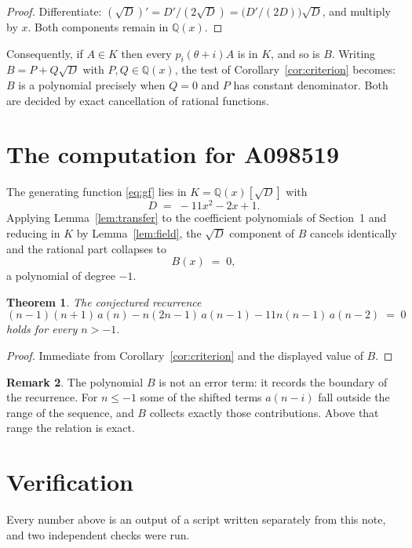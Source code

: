 \documentclass[11pt,a4paper]{article}
\theoremstyle{plain}
\newtheorem{theorem}{Theorem}
\theoremstyle{definition}
\newtheorem{remark}[theorem]{Remark}
\begin{document}
\begin{proof}
Differentiate: $(\sqrt{D})'=D'/(2\sqrt{D})=\bigl(D'/(2D)\bigr)\sqrt{D}$, and multiply by
$x$. Both components remain in $\mathbb{Q}(x)$.
\end{proof}

Consequently, if $A\in K$ then every $p_{i}(\theta+i)A$ is in $K$, and so is $B$. Writing
$B=P+Q\sqrt{D}$ with $P,Q\in\mathbb{Q}(x)$, the test of Corollary~\ref{cor:criterion}
becomes: $B$ is a polynomial precisely when $Q=0$ and $P$ has constant denominator. Both
are decided by exact cancellation of rational functions.

\section{The computation for A098519}

The generating function \eqref{eq:gf} lies in $K=\mathbb{Q}(x)[\sqrt{D}]$ with
\[
D \;=\; - 11 x^{2} - 2 x + 1 .
\]
Applying Lemma~\ref{lem:transfer} to the coefficient polynomials of Section~1 and reducing
in $K$ by Lemma~\ref{lem:field}, the $\sqrt{D}$ component of $B$ cancels identically and
the rational part collapses to
\[
B(x)\;=\;0 ,
\]
a polynomial of degree $-1$.

\begin{theorem}
The conjectured recurrence
\[
\left(n - 1\right) \left(n + 1\right)\,a(n) -  n \left(2 n - 1\right)\,a(n-1) -  11 n \left(n - 1\right)\,a(n-2) \;=\;0
\]
holds for every $n>-1$.
\end{theorem}

\begin{proof}
Immediate from Corollary~\ref{cor:criterion} and the displayed value of $B$.
\end{proof}

\begin{remark}
The polynomial $B$ is not an error term: it records the boundary of the recurrence. For
$n\le-1$ some of the shifted terms $a(n-i)$ fall outside the range of the sequence,
and $B$ collects exactly those contributions. Above that range the relation is exact.
\end{remark}

\section{Verification}

Every number above is an output of a script written separately from this note, and two
independent checks were run.
\end{document}

